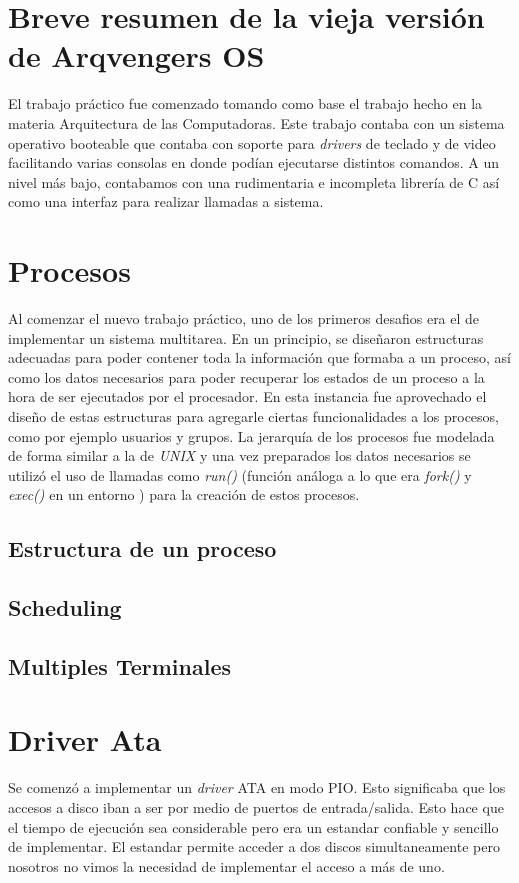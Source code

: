 \documentclass[a4paper,10pt]{article}
\begin{document}
\newpage
\section{Breve resumen de la vieja versión de Arqvengers OS}
El trabajo práctico fue comenzado tomando como base el trabajo hecho en la materia Arquitectura de las Computadoras.
 Este trabajo contaba con un sistema operativo booteable que contaba con soporte para \textit{drivers} de
  teclado y de video facilitando varias consolas en donde podían ejecutarse distintos comandos. 
  A un nivel más bajo, contabamos con una rudimentaria e incompleta librería de C así como una interfaz para realizar
  llamadas a sistema.
\newpage
\section{Procesos}
    Al comenzar el nuevo trabajo práctico, uno de los primeros desafios era el de implementar un sistema multitarea.
     En un principio, se diseñaron estructuras adecuadas para poder contener toda la información que formaba a un proceso,
      así como los datos necesarios para poder recuperar los estados de un proceso a la hora de ser ejecutados
      por el procesador. En esta instancia fue aprovechado el diseño de estas estructuras para agregarle ciertas
      funcionalidades a los procesos, como por ejemplo usuarios y grupos.
     La jerarquía de los procesos fue modelada de forma similar a la de \textit{UNIX} y una vez preparados los datos
      necesarios se utilizó el uso de llamadas como \textit{run()} (función análoga a lo que era \textit{fork()} y
      \textit{exec()} en un entorno ) para la creación de estos procesos.

    \subsection{Estructura de un proceso}

    \subsection{Scheduling}

    \subsection{Multiples Terminales}
\newpage
\section{Driver Ata}
    Se comenzó a implementar un \textit{driver} ATA en modo PIO. Esto significaba que los accesos a disco iban a ser
    por medio de puertos de entrada/salida. Esto hace que el tiempo de ejecución sea considerable pero era un estandar
    confiable y sencillo de implementar.
    El estandar permite acceder a dos discos simultaneamente pero nosotros no vimos la necesidad de implementar el 
    acceso a más de uno.
    
\end{document}
